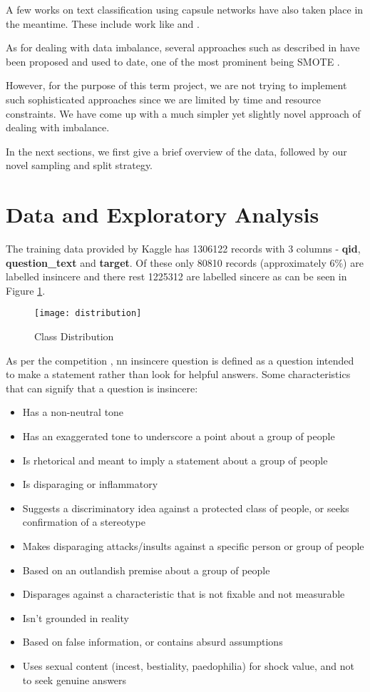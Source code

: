 \documentclass[11pt,twocolumn,letterpaper]{article}
\begin{document}
A few works on text classification using capsule networks  \cite{capsule1} have also taken place in the meantime. These include work like \cite{capsule2} and \cite{capsule3}.

As for dealing with data imbalance, several approaches such as described in \cite{Imbalanced1} have been proposed and used to date, one of the most prominent being SMOTE \cite{smote}.

However, for the purpose of this term project, we are not trying to implement such sophisticated approaches since we are limited by time and resource constraints.  We have come up with a much simpler yet slightly novel approach of dealing with imbalance.

In the next sections, we first give a brief overview of the data, followed by our novel sampling and split strategy.

\section{Data and Exploratory Analysis}

The training data provided by Kaggle has 1306122 records with 3 columns - \textbf{qid},  \textbf{question\_text} and \textbf{target}. Of these only 80810 records (approximately 6\%) are labelled insincere and there rest 1225312 are labelled  sincere as can be seen in Figure  \ref{fig:distribution}.

\begin{figure}[h]
\texttt{[image: distribution]}
\caption{Class Distribution}
\label{fig:distribution}
\centering
\end{figure}

As per the competition \cite{Kaggle1}, nn insincere question is defined as a question intended to make a statement rather than look for helpful answers. Some characteristics that can signify that a question is insincere:

\begin{itemize}
  \item Has a non-neutral tone
  \item Has an exaggerated tone to underscore a point about a group of people
  \item Is rhetorical and meant to imply a statement about a group of people
  \item Is disparaging or inflammatory
  \item Suggests a discriminatory idea against a protected class of people, or seeks confirmation of a stereotype
  \item Makes disparaging attacks/insults against a specific person or group of people
  \item Based on an outlandish premise about a group of people
  \item Disparages against a characteristic that is not fixable and not measurable
  \item Isn't grounded in reality
  \item Based on false information, or contains absurd assumptions
  \item Uses sexual content (incest, bestiality, paedophilia) for shock value, and not to seek genuine answers
\end{itemize}
\end{document}
